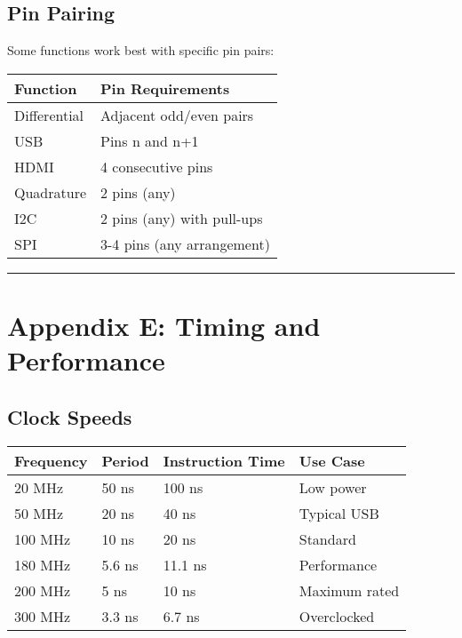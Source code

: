 \documentclass[11pt]{book}
\begin{document}
\hypertarget{pin-pairing}{%
\subsection{Pin Pairing}\label{pin-pairing}}

Some functions work best with specific pin pairs:

\begin{longtable}[]{@{}ll@{}}
\toprule
Function & Pin Requirements \\
\midrule
\endhead
Differential & Adjacent odd/even pairs \\
USB & Pins n and n+1 \\
HDMI & 4 consecutive pins \\
Quadrature & 2 pins (any) \\
I2C & 2 pins (any) with pull-ups \\
SPI & 3-4 pins (any arrangement) \\
\bottomrule
\end{longtable}

\begin{center}\rule{0.5\linewidth}{0.5pt}\end{center}

\hypertarget{appendix-e-timing-and-performance}{%
\section{Appendix E: Timing and
Performance}\label{appendix-e-timing-and-performance}}

\hypertarget{clock-speeds}{%
\subsection{Clock Speeds}\label{clock-speeds}}

\begin{longtable}[]{@{}llll@{}}
\toprule
Frequency & Period & Instruction Time & Use Case \\
\midrule
\endhead
20 MHz & 50 ns & 100 ns & Low power \\
50 MHz & 20 ns & 40 ns & Typical USB \\
100 MHz & 10 ns & 20 ns & Standard \\
180 MHz & 5.6 ns & 11.1 ns & Performance \\
200 MHz & 5 ns & 10 ns & Maximum rated \\
300 MHz & 3.3 ns & 6.7 ns & Overclocked \\
\bottomrule
\end{longtable}
\end{document}
